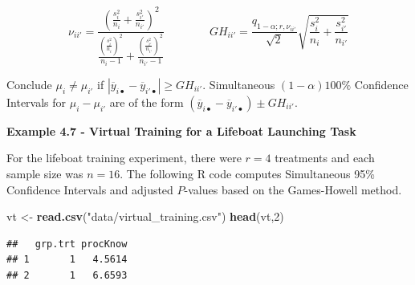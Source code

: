 \documentclass[
]{book}
\newenvironment{Shaded}{\begin{snugshade}}{\end{snugshade}}
\newcommand{\DecValTok}[1]{\textcolor[rgb]{0.00,0.00,0.81}{#1}}
\newcommand{\FunctionTok}[1]{\textcolor[rgb]{0.13,0.29,0.53}{\textbf{#1}}}
\newcommand{\NormalTok}[1]{#1}
\newcommand{\OtherTok}[1]{\textcolor[rgb]{0.56,0.35,0.01}{#1}}
\newcommand{\StringTok}[1]{\textcolor[rgb]{0.31,0.60,0.02}{#1}}
\begin{document}
\[
\nu_{ii'}=\frac{\left(\frac{s_i^2}{n_i}+\frac{s_{i'}^2}{n_{i'}}\right)^2}
{\frac{\left(\frac{s_i^2}{n_i}\right)^2}{n_i-1} + \frac{\left(\frac{s_{i'}^2}{n_{i'}}\right)^2}{n_{i'}-1}}
\qquad \qquad
GH_{ii'}=\frac{q_{1-\alpha;r,\nu_{ii'}}}{\sqrt{2}}\sqrt{\frac{s_i^2}{n_i}+\frac{s_{i'}^2}{n_{i'}}}
\]

Conclude \(\mu_i\ne\mu_{i'}\) if
\(\left|\overline{y}_{i\bullet}-\overline{y}_{i'\bullet}\right| \ge GH_{ii'}\).
Simultaneous \((1-\alpha)100\%\) Confidence Intervals for
\(\mu_i-\mu_{i'}\) are of the form
\(\left(\overline{y}_{i\bullet}-\overline{y}_{i'\bullet}\right)\pm GH_{ii'}\).

\textbf{Example 4.7 - Virtual Training for a Lifeboat Launching Task}

For the lifeboat training experiment, there were \(r=4\) treatments and
each sample size was \(n=16\). The following R code computes
Simultaneous 95\% Confidence Intervals and adjusted \(P\)-values based
on the Games-Howell method.

\begin{Shaded}
\begin{Highlighting}[]
\NormalTok{vt }\OtherTok{\textless{}{-}} \FunctionTok{read.csv}\NormalTok{(}\StringTok{"data/virtual\_training.csv"}\NormalTok{)}
\FunctionTok{head}\NormalTok{(vt,}\DecValTok{2}\NormalTok{)}
\end{Highlighting}
\end{Shaded}

\begin{verbatim}
##   grp.trt procKnow
## 1       1   4.5614
## 2       1   6.6593
\end{verbatim}
\end{document}
